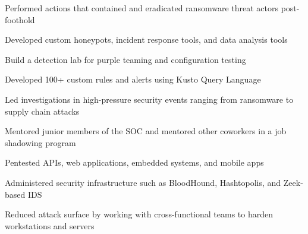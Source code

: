 \item Performed actions that contained and eradicated ransomware threat actors post-foothold
\item Developed custom honeypots, incident response tools, and data analysis tools
\item Build a detection lab for purple teaming and configuration testing
\item Developed 100+ custom rules and alerts using Kusto Query Language
\item Led investigations in high-pressure security events ranging from ransomware to supply chain attacks
\item Mentored junior members of the SOC and mentored other coworkers in a job shadowing program
\item Pentested APIs, web applications, embedded systems, and mobile apps
\item Administered security infrastructure such as BloodHound, Hashtopolis, and Zeek-based IDS
\item Reduced attack surface by working with cross-functional teams to harden workstations and servers
